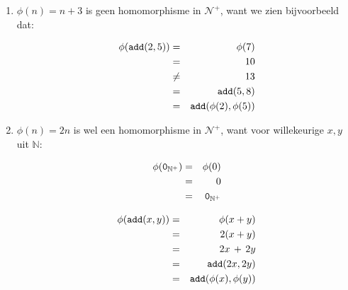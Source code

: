 \documentclass[a4paper,11pt]{article}
\begin{document}
\begin{enumerate}

\item %

  $\phi(n) = n+3$ is geen homomorphisme in $\mathcal{N}^{+}$, want we zien
  bijvoorbeeld dat:

  \begin{eqnarray*}
    \phi(\verb|add|(2,5)) & = & \phi(7) \\
                          & = & 10 \\
                          & \ne & 13 \\
                          & = & \verb|add|(5,8) \\
                          & = & \verb|add|(\phi(2),\phi(5))
  \end{eqnarray*}

\item %

  $\phi(n) = 2n$ is wel een homomorphisme in $\mathcal{N}^{+}$, want voor
  willekeurige $x,y$ uit $\mathbb{N}$:

  \begin{eqnarray*}
    \phi(\verb|0|_{\mathbb{N}^{+}}) & = & \phi(0) \\
                                    & = & 0 \\
                                    & = & \verb|0|_{\mathbb{N}^{+}}
  \end{eqnarray*}

  \begin{eqnarray*}
    \phi(\verb|add|(x,y)) & = & \phi(x+y) \\
                          & = & 2(x+y) \\
                          & = & 2x \, + \, 2y \\
                          & = & \verb|add|(2x, 2y) \\
                          & = & \verb|add|(\phi(x), \phi(y))
  \end{eqnarray*}

\end{enumerate}
\end{document}
